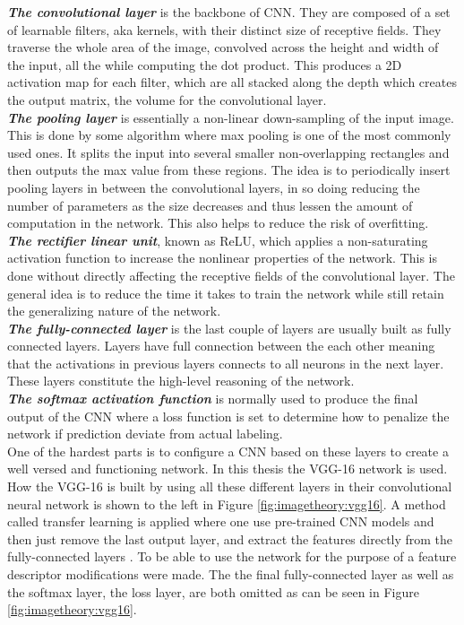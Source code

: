 \textbf{\emph{The convolutional layer}} is the backbone of  CNN. They are composed of a set of learnable filters, aka kernels, with their distinct size of receptive fields. They traverse the whole area of the image, convolved across the height and width of the input, all the while computing the dot product. This produces a 2D activation map for each filter, which are all stacked along the depth which creates the output matrix, the volume for the convolutional layer. \\
\textbf{\emph{The pooling layer}} is essentially a non-linear down-sampling of the input image. This is done by some algorithm where max pooling is one of the most commonly used ones. It splits the input into several smaller non-overlapping rectangles and then outputs the max value from these regions. The idea is to periodically insert pooling layers in between the convolutional layers, in so doing reducing the number of parameters as the size decreases and thus lessen the amount of computation in the network. This also helps to reduce the risk of overfitting. \\
 \textbf{\emph{The rectifier linear unit}}, known as ReLU, which applies a non-saturating activation function to increase the nonlinear properties of the network. This is done without directly affecting the receptive fields of the convolutional layer. The general idea is to reduce the time it takes to train the network while still retain the generalizing nature of the network. \\
\textbf{\emph{The fully-connected layer}}  is the last couple of layers are usually built as fully connected layers. Layers have full connection between the each other meaning that the activations in previous layers connects to all neurons in the next layer. These layers constitute the high-level reasoning of the network. \\
\textbf{\emph{The softmax activation function}} is normally used to produce the final output of the CNN where a loss function is set to determine how to penalize the network if prediction deviate from actual labeling. \\

One of the hardest parts is to configure a CNN based on these layers to create a well versed and functioning network. In this thesis the VGG-16 network is used. How the VGG-16 is built by using all these different layers in their convolutional neural network is shown to the left in Figure \ref{fig:imagetheory:vgg16}. A method called transfer learning is applied where one use pre-trained CNN models and then just remove the last output layer, and extract the features directly from the fully-connected layers \cite{koskela2014convolutional}. To be able to use the network for the purpose of a feature descriptor modifications were made. The the final fully-connected layer as well as the softmax layer, the loss layer, are both omitted as can be seen in Figure \ref{fig:imagetheory:vgg16}. 


